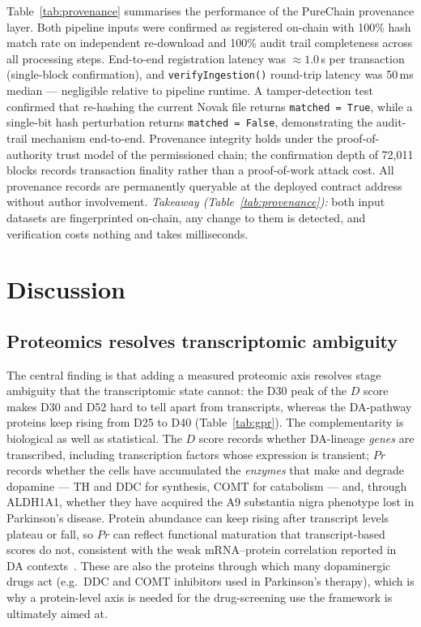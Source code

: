 \documentclass[5p,times,twocolumn]{elsarticle}
\newcommand{\rtag}[1]{}
\newcommand{\rev}[2]{\rtag{#1}#2}
\newenvironment{revblock}[1]{\par\rtag{#1}\ignorespaces}{\par}
\newcommand{\lang}[1]{#1}
\begin{document}
Table~\ref{tab:provenance} summarises \lang{the performance of the
  PureChain provenance layer}.
Both pipeline inputs \lang{were confirmed as} registered on-chain with
100\% hash match rate on independent re-download and 100\% audit
trail completeness across all processing steps.
End-to-end registration latency was $\approx 1.0$\,s per
transaction (single-block confirmation), and
\texttt{verifyIngestion()} round-trip latency was 50\,ms median
--- negligible relative to pipeline runtime.
A tamper-detection test confirmed that re-hashing the current
Novak file returns \texttt{matched = True}, while a single-bit
hash perturbation returns \texttt{matched = False},
demonstrating the audit-trail mechanism end-to-end.
Provenance integrity holds under the proof-of-authority trust
model of the permissioned chain; the confirmation depth of
72,011 blocks records transaction finality rather than a
proof-of-work attack cost.
All provenance records are permanently queryable at the deployed
contract address without author involvement.
\rev{R1.13}{\textit{Takeaway (Table~\ref{tab:provenance}):} both
  input datasets are fingerprinted on-chain, any change to them is
  detected, and verification costs nothing and takes milliseconds.}

\section{Discussion}

\subsection{\textbf{Proteomics resolves transcriptomic
    ambiguity}}

\begin{revblock}{R1.14,R2.14}
  The central finding is that adding a measured proteomic axis
  resolves stage ambiguity that the transcriptomic state cannot:
  the D30 peak of the $D$ score makes D30 and D52 hard to tell
  apart from transcripts, whereas the DA-pathway proteins keep
  rising from D25 to D40 (Table~\ref{tab:gpr}).
  The complementarity is biological as well as statistical.
  The $D$ score records whether DA-lineage \textit{genes} are
  transcribed, including transcription factors whose expression
  is transient; $Pr$ records whether the cells have accumulated
  the \textit{enzymes} that make and degrade dopamine --- TH and
  DDC for synthesis, COMT for catabolism --- and, through ALDH1A1,
  whether they have acquired the A9 substantia nigra phenotype
  lost in Parkinson's disease. Protein abundance can keep rising
  after transcript levels plateau or fall, so $Pr$ can reflect
  functional maturation that transcript-based scores do not,
  consistent with the weak mRNA--protein correlation reported in
  DA contexts~\cite{novak2022single,cavarischia2024proteome}.
  These are also the proteins through which many
  dopaminergic drugs act (e.g.\ DDC and COMT inhibitors used in
  Parkinson's therapy), which is why a protein-level axis is
  needed for the drug-screening use the framework is ultimately
  aimed at.
\end{revblock}
\end{document}
